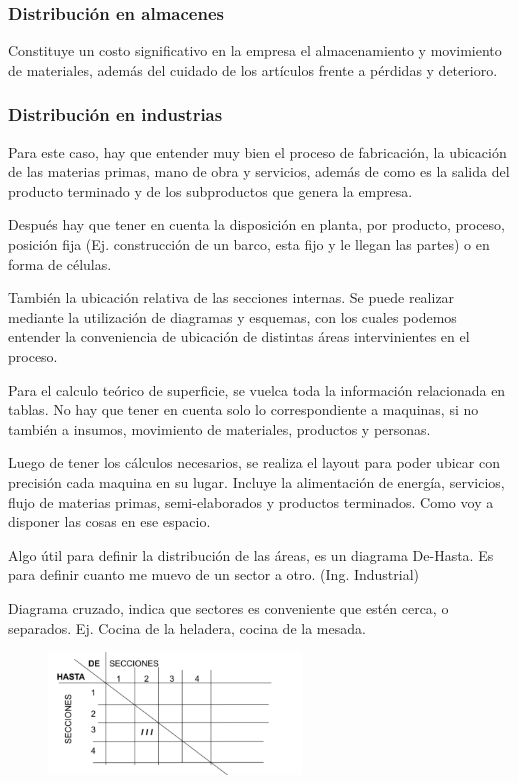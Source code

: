 \documentclass[titlepage,a4paper]{article}
\begin{document}
\subsubsection*{Distribución en almacenes}
Constituye un costo significativo en la empresa el almacenamiento y movimiento de materiales, además del cuidado de los artículos frente a pérdidas y deterioro.

\subsubsection*{Distribución en industrias}
Para este caso, hay que entender muy bien el proceso de fabricación, la ubicación de las materias primas, mano de obra y servicios, además de como es la salida del producto terminado y de los subproductos que genera la empresa.

Después hay que tener en cuenta la disposición en planta, por producto, proceso, posición fija (Ej. construcción de un barco, esta fijo y le llegan las partes) o en forma de células.

También la ubicación relativa de las secciones internas. Se puede realizar mediante la utilización de diagramas y esquemas, con los cuales podemos entender la conveniencia de ubicación de distintas áreas intervinientes en el proceso.

Para el calculo teórico de superficie, se vuelca toda la información relacionada en tablas. No hay que tener en cuenta solo lo correspondiente a maquinas, si no también a insumos, movimiento de materiales, productos y personas.

Luego de tener los cálculos necesarios, se realiza el layout para poder ubicar con precisión cada maquina en su lugar. Incluye la alimentación de energía, servicios, flujo de materias primas, semi-elaborados y productos terminados. Como voy a disponer las cosas en ese espacio.


Algo útil para definir la distribución de las áreas, es un diagrama De-Hasta. Es para definir cuanto me muevo de un sector a otro. (Ing. Industrial)

Diagrama cruzado, indica que sectores es conveniente que estén cerca, o separados. Ej. Cocina de la heladera, cocina de la mesada.

\begin{figure}[!htb]
    \centering
    \includegraphics[width=0.6\textwidth]{imagenes/DistribucionOficinas.PNG}
\end{figure}
\end{document}
